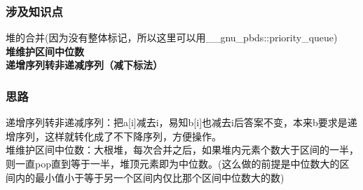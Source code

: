 		\subsubsection{涉及知识点}
			堆的合并(因为没有整体标记，所以这里可以用\_\_gnu\_pbds::priority\_queue)\\
			\textbf{堆维护区间中位数}\\
			\textbf{递增序列转非递减序列（减下标法）}
		\subsubsection{思路}
			递增序列转非递减序列：把a[i]减去i，易知b[i]也减去i后答案不变，本来b要求是递增序列，这样就转化成了不下降序列，方便操作。\\
			堆维护区间中位数：大根堆，每次合并之后，如果堆内元素个数大于区间的一半，则一直pop直到等于一半，堆顶元素即为中位数。(这么做的前提是中位数大的区间内的最小值小于等于另一个区间内仅比那个区间中位数大的数)